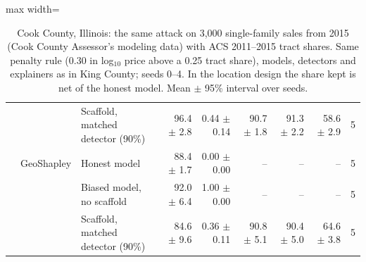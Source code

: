 \begin{table}[t]
\begin{adjustbox}{max width=\linewidth}
\begin{tabular}{lllrrrrrr}
 &  & Scaffold, matched detector (90\%) & 96.4 $\pm$ 2.8 & 0.44 $\pm$ 0.14 & 90.7 $\pm$ 1.8 & 91.3 $\pm$ 2.2 & 58.6 $\pm$ 2.9 & 5 \\
 & GeoShapley & Honest model & 88.4 $\pm$ 1.7 & 0.00 $\pm$ 0.00 & -- & -- & -- & 5 \\
 &  & Biased model, no scaffold & 92.0 $\pm$ 6.4 & 1.00 $\pm$ 0.00 & -- & -- & -- & 5 \\
 &  & Scaffold, matched detector (90\%) & 84.6 $\pm$ 9.6 & 0.36 $\pm$ 0.11 & 90.8 $\pm$ 5.1 & 90.4 $\pm$ 5.0 & 64.6 $\pm$ 3.8 & 5 \\
\bottomrule
\end{tabular}
\end{adjustbox}
\caption{Cook County, Illinois: the same attack on 3,000 single-family sales from 2015 (Cook County Assessor's modeling data) with ACS 2011--2015 tract shares. Same penalty rule (0.30 in log$_{10}$ price above a 0.25 tract share), models, detectors and explainers as in King County; seeds 0--4. In the location design the share kept is net of the honest model. Mean $\pm$ 95\% interval over seeds.}
\label{tab:cook}
\end{table}
